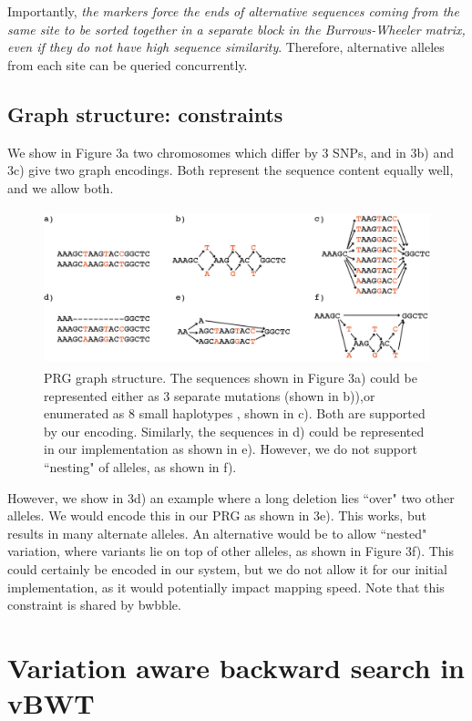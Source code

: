 \documentclass[runningheads,a4paper]{llncs}
\begin{document}
Importantly, \textit{the markers force the ends of alternative sequences coming from the same site to be sorted together in a separate block in the Burrows-Wheeler matrix, even if they do not have high sequence similarity}. Therefore, alternative alleles from each site can be queried concurrently.


\subsection{Graph structure: constraints}


We show in Figure 3a two chromosomes which differ by 3 SNPs, and in 3b) and 3c) give two graph encodings. Both represent the sequence content equally well, and we allow both.

\begin{figure}
\centering
\includegraphics[height=4.5cm]{graph_construction.png}
\caption{PRG graph structure. The sequences shown in Figure 3a) could be represented either as 3 separate mutations (shown in b)),or enumerated as 8 small haplotypes , shown in c). Both are supported by our encoding. Similarly, the sequences in d) could be represented in our implementation as shown in e). However, we do not support ``nesting" of alleles, as shown in f).}
\label{lab}
\end{figure}


 However, we show in 3d) an example where a long deletion lies ``over" two other alleles. We would encode this in our PRG as shown in 3e). This works, but results in many alternate alleles. An alternative would be to allow ``nested" variation, where variants lie on top of other alleles, as shown in Figure 3f). This could certainly be encoded in our system, but we do not allow it for our initial implementation, as it would potentially impact mapping speed. Note that this constraint is shared by bwbble.




\section{Variation aware backward search in vBWT}
\end{document}
